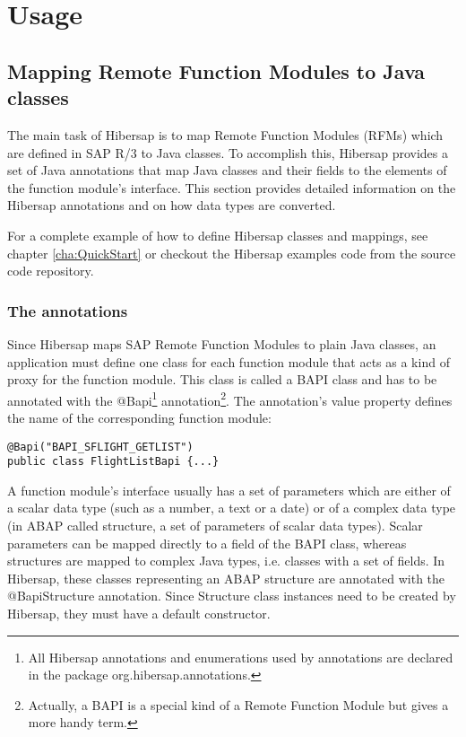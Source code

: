 \chapter{Usage}
\label{cha:Usage}

\section{Mapping Remote Function Modules to Java classes} 
\label{cha:Mapping}
The main task of Hibersap is to map Remote Function Modules (RFMs) which are defined in SAP R/3 to Java classes. To accomplish this, Hibersap provides a set of Java annotations that map Java classes and their fields to the elements of the function module's interface. This section provides detailed information on the Hibersap annotations and on how data types are converted.

For a complete example of how to define Hibersap classes and mappings, see chapter \ref{cha:QuickStart} or checkout the Hibersap examples code from the source code repository.

\subsection{The annotations}
Since Hibersap maps SAP Remote Function Modules to plain Java classes, an application must define one class for each function module that acts as a kind of proxy for the function module. This class is called a BAPI class and has to be annotated with the @Bapi\footnote{All Hibersap annotations and enumerations used by annotations are declared in the package org.hibersap.annotations.} annotation\footnote{Actually, a BAPI is a special kind of a Remote Function Module but gives a more handy term.}. The annotation's value property defines the name of the corresponding function module:

\begin{lstlisting}
@Bapi("BAPI_SFLIGHT_GETLIST") 
public class FlightListBapi {...}
\end{lstlisting}

A function module's interface usually has a set of parameters which are either of a scalar data type (such as a number, a text or a date) or of a complex data type (in ABAP called structure, a set of parameters of scalar data types). Scalar parameters can be mapped directly to a field of the BAPI class, whereas structures are mapped to complex Java types, i.e. classes with a set of fields. In Hibersap, these classes representing an ABAP structure are annotated with the @BapiStructure annotation. Since Structure class instances need to be created by Hibersap, they must have a default constructor.

